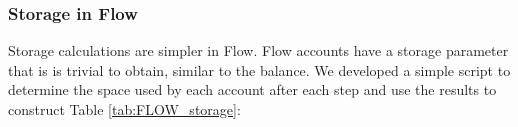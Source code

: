 \documentclass[../NFTComp_IEEE.tex]{subfiles}
\begin{document}
\subsubsection{Storage in Flow}
Storage calculations are simpler in Flow. Flow accounts have a storage parameter that is is trivial to obtain, similar to the balance. We developed a simple script to determine the space used by each account after each step and use the results to construct Table \ref{tab:FLOW_storage}:

\begin{table}[ht]
    \centering
    \caption{FLOW token balance of each account in the exercise}
    \vspace{0.1cm}
    \label{tab:FLOW_storage}
\end{table}
\end{document}
